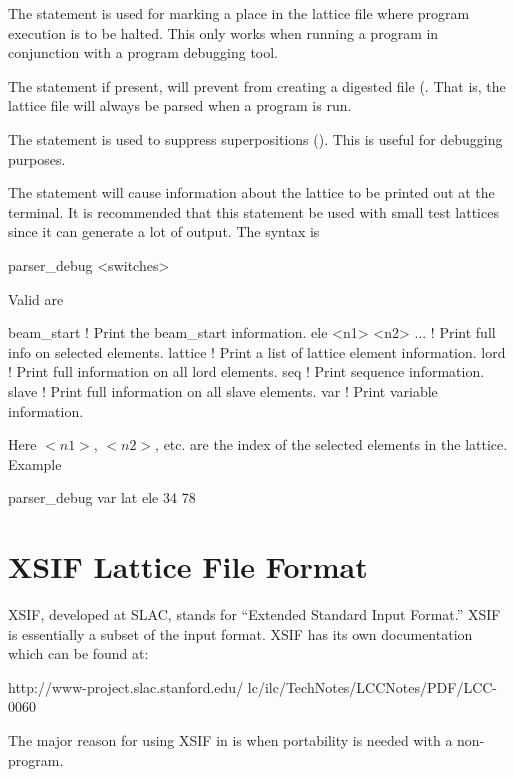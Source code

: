 {{The  statement is used for marking a place in the lattice file
where program execution is to be halted. This only works when running
a program in conjunction with a program debugging tool. 

The  statement if present, will prevent \bmad from 
creating a digested file (. That is, the lattice file will always
be parsed when a program is run.

The  statement is used to suppress superpositions
(). This is useful for debugging purposes.

The  statement will cause information about the
lattice to be printed out at the terminal. It is recommended that this
statement be used with small test lattices since it can generate a lot
of output. The syntax is
\begin{example}
  parser_debug <switches>
\end{example}
Valid  are
\begin{example}
  beam_start          ! Print the beam_start information.
  ele <n1> <n2> ...   ! Print full info on selected elements.
  lattice             ! Print a list of lattice element information.
  lord                ! Print full information on all lord elements.
  seq                 ! Print sequence information.
  slave               ! Print full information on all slave elements.
  var                 ! Print variable information.
\end{example}
Here $<n1>$, $<n2>$, etc. are the index of the selected elements in
the lattice.  Example
\begin{example}
  parser_debug var lat ele 34 78
\end{example}

\section{XSIF Lattice File Format}
\label{s:xsif}

XSIF, developed at SLAC, stands for 
``Extended Standard Input Format.''
XSIF is essentially a subset of the \mad\cite{b:maduser} input format. 
XSIF has its own documentation which can be found at:
\begin{example}
  http://www-project.slac.stanford.edu/
              lc/ilc/TechNotes/LCCNotes/PDF/LCC-0060%
\end{example}
The major reason for using XSIF in \bmad is when portability is needed
with a non-\bmad program.

}}
